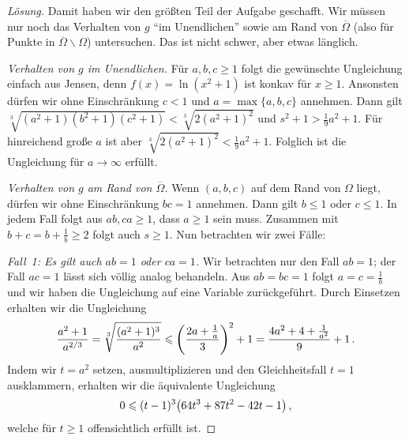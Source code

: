 \begin{proof}[Lösung]
	Damit haben wir den größten Teil der Aufgabe geschafft. Wir müssen nur noch das Verhalten von $g$ \enquote{im Unendlichen} sowie am Rand von $\overline{\Omega}$ (also für Punkte in $\overline{\Omega}\smallsetminus \Omega$) untersuchen. Das ist nicht schwer, aber etwas länglich.
	
	\emph{Verhalten von $g$ im Unendlichen.} Für $a,b,c\geqslant 1$ folgt die gewünschte Ungleichung einfach aus Jensen, denn $f(x)=\ln(x^2+1)$ ist konkav für $x\geqslant 1$. Ansonsten dürfen wir ohne Einschränkung $c<1$ und $a=\max\{a,b,c\}$ annehmen. Dann gilt $\sqrt[3]{(a^2+1)(b^2+1)(c^2+1)}<\sqrt[3]{2(a^2+1)^2}$ und $s^2+1> \frac19a^2+1$. Für hinreichend große $a$ ist aber $\sqrt[3]{2(a^2+1)^2}<\frac19a^2+1$. Folglich ist die Ungleichung für $a\rightarrow \infty$ erfüllt.
	
	\emph{Verhalten von $g$ am Rand von $\overline{\Omega}$.} Wenn $(a,b,c)$ auf dem Rand von $\Omega$ liegt, dürfen wir ohne Einschränkung $bc=1$ annehmen. Dann gilt $b\leqslant 1$ oder $c\leqslant 1$. In jedem Fall folgt aus $ab,ca\geqslant 1$, dass $a\geqslant 1$ sein muss. Zusammen mit $b+c=b+\frac1b\geqslant 2$ folgt auch $s\geqslant 1$. Nun betrachten wir zwei Fälle:
	
	\emph{Fall~1: Es gilt auch $ab=1$ oder $ca=1$.} Wir betrachten nur den Fall $ab=1$; der Fall $ac=1$ lässt sich völlig analog behandeln. Aus $ab=bc=1$ folgt $a=c=\frac1b$ und wir haben die Ungleichung auf eine Variable zurückgeführt. Durch Einsetzen erhalten wir die Ungleichung
	\begin{equation*}
		\frac{a^2+1}{a^{2/3}}=\sqrt[3]{\frac{(a^2+1)^3}{a^2}}\leqslant \parens*{\frac{2a+\frac1a}{3}}^2+1=\frac{4a^2+4+\frac1{a^2}}{9}+1\,.
	\end{equation*}
	Indem wir $t=a^2$ setzen, ausmultiplizieren und den Gleichheitsfall $t=1$ ausklammern, erhalten wir die äquivalente Ungleichung
	\begin{equation*}
		0\leqslant (t-1)^3\parens*{64t^3+87t^2-42t-1}\,,
	\end{equation*}
	welche für $t\geqslant 1$ offensichtlich erfüllt ist.
	

\end{proof}
